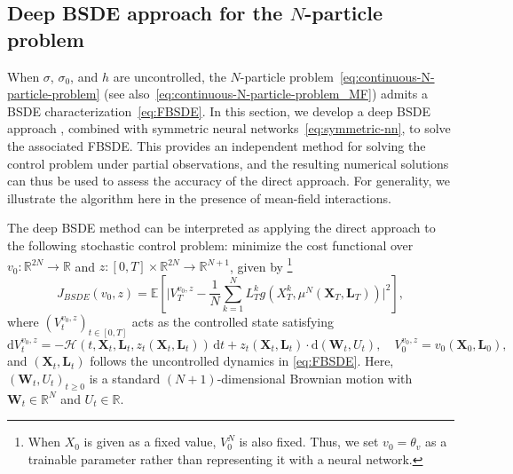 \documentclass[11pt]{article}
\numberwithin{equation}{section}
\theoremstyle{plain}
\theoremstyle{definition}
\theoremstyle{remark}
\newcommand{\R}{\mathbb{R}}
\newcommand{\dd}{\mathrm{d}}
\begin{document}
	\subsection{Deep BSDE approach for the \texorpdfstring{$N$}{}-particle problem}
	When $\sigma$, $\sigma_0$, and $h$ are uncontrolled, the $N$-particle problem~\eqref{eq:continuous-N-particle-problem} (see also~\eqref{eq:continuous-N-particle-problem_MF}) admits a BSDE characterization~\eqref{eq:FBSDE}. In this section, we develop a deep BSDE approach \cite{han2018solving}, combined with symmetric neural networks~\eqref{eq:symmetric-nn}, to solve the associated FBSDE. This provides an independent method for solving the control problem under partial observations, and the resulting numerical solutions can thus be used to assess the accuracy of the direct approach. For generality, we illustrate the algorithm here in the presence of mean-field interactions. 
	
	The deep BSDE method can be interpreted as applying the direct approach to the following stochastic control problem: minimize the cost functional over $v_0:\R^{2N}\to \R$ and $z:[0,T] \times \R^{2N} \to \R^{N+1}$, given by \footnote{When $X_0$ is given as a fixed value, $V_0^{N}$ is also fixed. Thus, we set $v_0 = \theta_v$ as a trainable parameter rather than representing it with a neural network.}
	\begin{equation*}
		J_{BSDE}(v_0, z) = \mathbb{E}\left[ \bigg|V_T^{v_0, z} - \frac{1}{N}\sum_{k=1}^N L_T^k g(X_T^k, \mu^N(\mathbf{X}_T, \mathbf{L}_T)) \bigg|^2 \right], 
	\end{equation*}
	where $(V_t^{v_0, z})_{t\in [0,T]}$ acts as the controlled state satisfying 
	\begin{equation*}
		\dd V_t^{v_0, z} = -\mathcal{H}(t,\mathbf{X}_t, \mathbf{L}_t, z_t(\mathbf{X}_t, \mathbf{L}_t)) \,\dd t + z_t(\mathbf{X}_t, \mathbf{L}_t) \cdot \dd (\mathbf{W}_t, U_t), \quad V_0^{v_0, z} = v_0(\mathbf{X}_0, \mathbf{L}_0), 
	\end{equation*}
	and $(\mathbf{X}_t, \mathbf{L}_t)$ follows the uncontrolled dynamics in \eqref{eq:FBSDE}. 
	Here, $(\mathbf{W}_t, U_t)_{t\ge 0}$ is a standard $(N+1)$-dimensional Brownian motion with $\mathbf{W}_t \in \R^{N}$ and $U_t\in \R$. 
	
\end{document}
